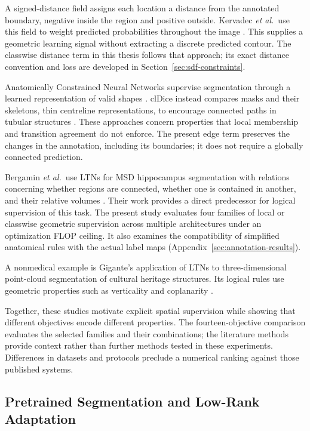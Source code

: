 \documentclass[12pt,a4paper]{article}
\begin{document}
A signed-distance field assigns each location a distance from the annotated
boundary, negative inside the region and positive outside. Kervadec \emph{et
al.}\ use this field to weight predicted probabilities throughout the image
\cite{kervadec2019boundary}. This supplies a geometric learning signal
without extracting a discrete predicted contour. The classwise distance term
in this thesis follows that approach; its exact distance convention and loss
are developed in Section~\ref{sec:sdf-constraints}.

Anatomically Constrained Neural Networks supervise segmentation through a
learned representation of valid shapes \cite{oktay2017anatomically}. clDice
instead compares masks and their skeletons, thin centreline representations,
to encourage connected paths in tubular structures \cite{shit2021cldice}.
These approaches concern properties that local membership and transition
agreement do not enforce. The present edge term preserves the changes in the
annotation, including its boundaries; it does not require a globally
connected prediction.

Bergamin \emph{et al.}\ use LTNs for MSD hippocampus segmentation with
relations concerning whether regions are connected, whether one is contained
in another, and their relative volumes \cite{bergamin2025integrating}. Their
work provides a direct predecessor for logical supervision of this task. The
present study evaluates four families of local or classwise geometric
supervision across multiple architectures under an optimization FLOP
ceiling. It also examines the compatibility of simplified anatomical rules
with the actual label maps (Appendix~\ref{sec:annotation-results}).

A nonmedical example is Gigante's application of LTNs to three-dimensional
point-cloud segmentation of cultural heritage structures. Its logical
rules use geometric properties such as verticality and coplanarity
\cite{gigante2025pointcloud}.

Together, these studies motivate explicit spatial supervision while showing
that different objectives encode different properties. The
fourteen-objective comparison evaluates the selected families and their
combinations; the literature methods provide context rather than further
methods tested in these experiments. Differences in datasets and protocols
preclude a numerical ranking against those published systems.

\subsection{Pretrained Segmentation and Low-Rank Adaptation}
\label{sec:pretrained-adaptation}
\end{document}
